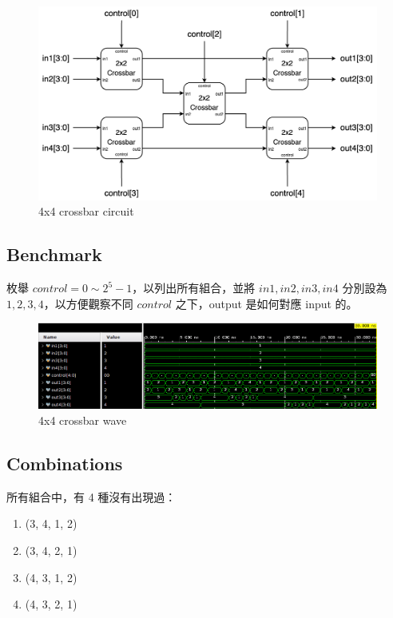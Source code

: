 \documentclass[10.5pt,compsoc,UTF8]{CjC}
\theoremstyle{mystyle}
\begin{document}
\begin{figure}[!h]
    \centering
    \includegraphics[width=\textwidth]{4x4 crossbar.png}
      \caption{4x4 crossbar circuit}
    \label{fig:4x4_crossbar}
\end{figure}

\newpage


\subsection{Benchmark}
枚舉 $control = 0 \sim 2^5 - 1$，以列出所有組合，並將 $in1, in2, in3, in4$ 分別設為 $1, 2, 3, 4$，以方便觀察不同 $control$ 之下，output 是如何對應 input 的。

\begin{figure}[h]
    \centering
    \includegraphics[width=\textwidth]{4x4_wave.png}
      \caption{4x4 crossbar wave}
    \label{fig:4x4_wave}
\end{figure}

\subsection{Combinations}

所有組合中，有 4 種沒有出現過：
\begin{enumerate}
    \item (3, 4, 1, 2)
    \item (3, 4, 2, 1)
    \item (4, 3, 1, 2)
    \item (4, 3, 2, 1)
\end{enumerate}
\end{document}
